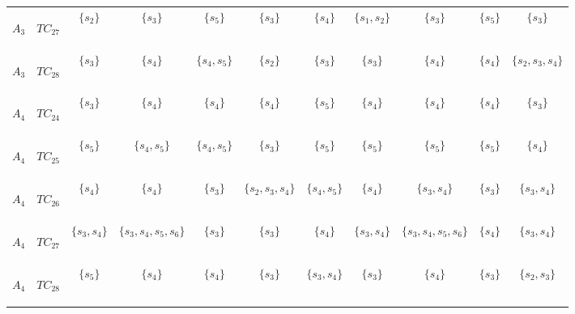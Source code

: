 \begin{table}[htp]
\begin{center}
\begin{tabular}{|cc|c|c|c|c|c|c|c|c|c|}
\begin{scriptsize}$A_3$\end{scriptsize} & \begin{scriptsize}$TC_{27}$\end{scriptsize} & $\{s_2\}$ & $\{s_3\}$ & $\{s_5\}$ & $\{s_3\}$ & $\{s_4\}$ & $\{s_1, s_2\}$ & $\{s_3\}$ & $\{s_5\}$ & $\{s_3\}$\\
\begin{scriptsize}$A_3$\end{scriptsize} & \begin{scriptsize}$TC_{28}$\end{scriptsize} & $\{s_3\}$ & $\{s_4\}$ & $\{s_4, s_5\}$ & $\{s_2\}$ & $\{s_3\}$ & $\{s_3\}$ & $\{s_4\}$ & $\{s_4\}$ & $\{s_2, s_3, s_4\}$\\
\begin{scriptsize}$A_4$\end{scriptsize} & \begin{scriptsize}$TC_{24}$\end{scriptsize} & $\{s_3\}$ & $\{s_4\}$ & $\{s_4\}$ & $\{s_4\}$ & $\{s_5\}$ & $\{s_4\}$ & $\{s_4\}$ & $\{s_4\}$ & $\{s_3\}$\\
\begin{scriptsize}$A_4$\end{scriptsize} & \begin{scriptsize}$TC_{25}$\end{scriptsize} & $\{s_5\}$ & $\{s_4, s_5\}$ & $\{s_4, s_5\}$ & $\{s_3\}$ & $\{s_5\}$ & $\{s_5\}$ & $\{s_5\}$ & $\{s_5\}$ & $\{s_4\}$\\
\begin{scriptsize}$A_4$\end{scriptsize} & \begin{scriptsize}$TC_{26}$\end{scriptsize} & $\{s_4\}$ & $\{s_4\}$ & $\{s_3\}$ & $\{s_2, s_3, s_4\}$ & $\{s_4, s_5\}$ & $\{s_4\}$ & $\{s_3, s_4\}$ & $\{s_3\}$ & $\{s_3, s_4\}$\\
\begin{scriptsize}$A_4$\end{scriptsize} & \begin{scriptsize}$TC_{27}$\end{scriptsize} & $\{s_3, s_4\}$ & $\{s_3, s_4, s_5, s_6\}$ & $\{s_3\}$ & $\{s_3\}$ & $\{s_4\}$ & $\{s_3, s_4\}$ & $\{s_3, s_4, s_5, s_6\}$ & $\{s_4\}$ & $\{s_3, s_4\}$\\
\begin{scriptsize}$A_4$\end{scriptsize} & \begin{scriptsize}$TC_{28}$\end{scriptsize} & $\{s_5\}$ & $\{s_4\}$ & $\{s_4\}$ & $\{s_3\}$ & $\{s_3, s_4\}$ & $\{s_3\}$ & $\{s_4\}$ & $\{s_3\}$ & $\{s_2, s_3\}$\\

\end{tabular}
\end{center}
\end{table}
